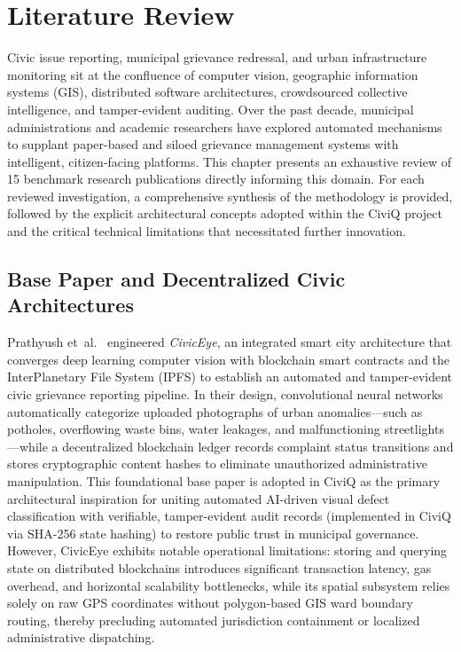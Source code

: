 \documentclass[12pt,a4paper]{report}
\begin{document}
\chapter{Literature Review}

Civic issue reporting, municipal grievance redressal, and urban infrastructure monitoring sit at the confluence of computer vision, geographic information systems (GIS), distributed software architectures, crowdsourced collective intelligence, and tamper-evident auditing. Over the past decade, municipal administrations and academic researchers have explored automated mechanisms to supplant paper-based and siloed grievance management systems with intelligent, citizen-facing platforms. This chapter presents an exhaustive review of 15 benchmark research publications directly informing this domain. For each reviewed investigation, a comprehensive synthesis of the methodology is provided, followed by the explicit architectural concepts adopted within the CiviQ project and the critical technical limitations that necessitated further innovation.

\section{Base Paper and Decentralized Civic Architectures}

Prathyush et~al.~\cite{ref_civiceye_basepaper} engineered \textit{CivicEye}, an integrated smart city architecture that converges deep learning computer vision with blockchain smart contracts and the InterPlanetary File System (IPFS) to establish an automated and tamper-evident civic grievance reporting pipeline. In their design, convolutional neural networks automatically categorize uploaded photographs of urban anomalies---such as potholes, overflowing waste bins, water leakages, and malfunctioning streetlights---while a decentralized blockchain ledger records complaint status transitions and stores cryptographic content hashes to eliminate unauthorized administrative manipulation. This foundational base paper is adopted in CiviQ as the primary architectural inspiration for uniting automated AI-driven visual defect classification with verifiable, tamper-evident audit records (implemented in CiviQ via SHA-256 state hashing) to restore public trust in municipal governance. However, CivicEye exhibits notable operational limitations: storing and querying state on distributed blockchains introduces significant transaction latency, gas overhead, and horizontal scalability bottlenecks, while its spatial subsystem relies solely on raw GPS coordinates without polygon-based GIS ward boundary routing, thereby precluding automated jurisdiction containment or localized administrative dispatching.
\end{document}

